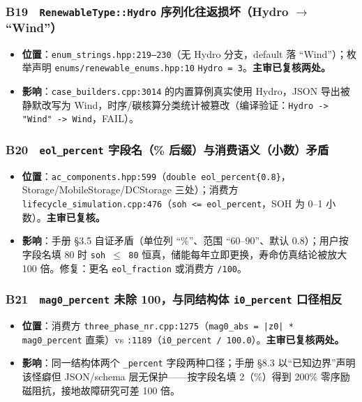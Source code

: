 \documentclass[11pt,a4paper,fontset=fandol]{ctexart}
\newcommand{\file}[1]{\texttt{#1}}
\begin{document}
\subsubsection*{B19　\texttt{RenewableType::Hydro} 序列化往返损坏（Hydro $\to$ ``Wind''）}
\begin{itemize}
  \item \textbf{位置}：\file{enum\_strings.hpp:219--230}（无 Hydro 分支，default 落 ``Wind''）；枚举声明 \file{enums/renewable\_enums.hpp:10} \texttt{Hydro = 3}。\textbf{主审已复核两处。}
  \item \textbf{影响}：\file{case\_builders.cpp:3014} 的内置算例真实使用 Hydro，JSON 导出被静默改写为 Wind，时序/碳核算分类统计被篡改（编译验证：\texttt{Hydro -> "Wind" -> Wind}，FAIL）。
\end{itemize}

\subsubsection*{B20　\texttt{eol\_percent} 字段名（\% 后缀）与消费语义（小数）矛盾}
\begin{itemize}
  \item \textbf{位置}：\file{ac\_components.hpp:599}（\texttt{double eol\_percent\{0.8\}}，Storage/MobileStorage/DCStorage 三处）；消费方 \file{lifecycle\_simulation.cpp:476}（\texttt{soh <= eol\_percent}，SOH 为 0--1 小数）。\textbf{主审已复核。}
  \item \textbf{影响}：手册 \S 3.5 自证矛盾（单位列 ``\%''、范围 ``60--90''、默认 0.8）；用户按字段名填 80 时 \texttt{soh $\le$ 80} 恒真，储能每年立即更换，寿命仿真结论被放大 100 倍。修复：更名 \texttt{eol\_fraction} 或消费方 \texttt{/100}。
\end{itemize}

\subsubsection*{B21　\texttt{mag0\_percent} 未除 100，与同结构体 \texttt{i0\_percent} 口径相反}
\begin{itemize}
  \item \textbf{位置}：消费方 \file{three\_phase\_nr.cpp:1275}（\texttt{mag0\_abs = |z0| * mag0\_percent} 直乘）vs \file{:1189}（\texttt{i0\_percent / 100.0}）。\textbf{主审已复核两处。}
  \item \textbf{影响}：同一结构体两个 \texttt{\_percent} 字段两种口径；手册 \S 8.3 以``已知边界''声明该怪癖但 JSON/schema 层无保护——按字段名填 2（\%）得到 200\% 零序励磁阻抗，接地故障研究可差 100 倍。
\end{itemize}
\end{document}

